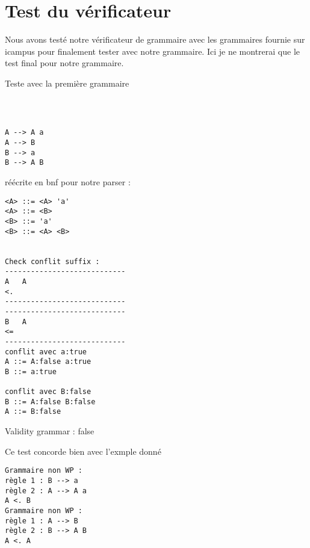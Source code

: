 \section{Test du vérificateur}
Nous avons testé notre vérificateur de grammaire avec les grammaires fournie sur icampus 
pour finalement tester avec notre grammaire. Ici je ne montrerai que le test final pour notre grammaire. 

Teste avec la première grammaire
{\tiny 
\begin{verbatim}
 


A --> A a 
A --> B 
B --> a 
B --> A B 
\end{verbatim}
}

réécrite en bnf pour notre parser :
{\tiny
\begin{verbatim}
<A> ::= <A> 'a'
<A> ::= <B>
<B> ::= 'a'
<B> ::= <A> <B>


Check conflit suffix : 
----------------------------
A   A
<.
----------------------------
----------------------------
B   A
<=
----------------------------
conflit avec a:true
A ::= A:false a:true
B ::= a:true 

conflit avec B:false
B ::= A:false B:false
A ::= B:false 
\end{verbatim}
}

Validity grammar : false


Ce test concorde bien avec l'exmple donné
{\tiny
\begin{verbatim}
Grammaire non WP :
règle 1 : B --> a 
règle 2 : A --> A a
A <. B
Grammaire non WP :
règle 1 : A --> B 
règle 2 : B --> A B
A <. A

\end{verbatim}
}


